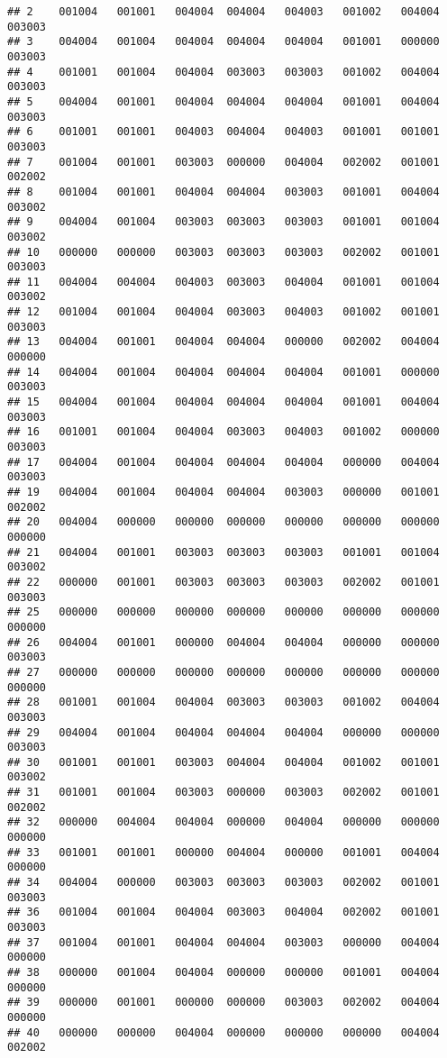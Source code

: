 \documentclass[
]{article}
\begin{document}
\begin{verbatim}
## 2    001004   001001   004004  004004   004003   001002   004004  003003
## 3    004004   001004   004004  004004   004004   001001   000000  003003
## 4    001001   001004   004004  003003   003003   001002   004004  003003
## 5    004004   001001   004004  004004   004004   001001   004004  003003
## 6    001001   001001   004003  004004   004003   001001   001001  003003
## 7    001004   001001   003003  000000   004004   002002   001001  002002
## 8    001004   001001   004004  004004   003003   001001   004004  003002
## 9    004004   001004   003003  003003   003003   001001   001004  003002
## 10   000000   000000   003003  003003   003003   002002   001001  003003
## 11   004004   004004   004003  003003   004004   001001   001004  003002
## 12   001004   001004   004004  003003   004003   001002   001001  003003
## 13   004004   001001   004004  004004   000000   002002   004004  000000
## 14   004004   001004   004004  004004   004004   001001   000000  003003
## 15   004004   001004   004004  004004   004004   001001   004004  003003
## 16   001001   001004   004004  003003   004003   001002   000000  003003
## 17   004004   001004   004004  004004   004004   000000   004004  003003
## 19   004004   001004   004004  004004   003003   000000   001001  002002
## 20   004004   000000   000000  000000   000000   000000   000000  000000
## 21   004004   001001   003003  003003   003003   001001   001004  003002
## 22   000000   001001   003003  003003   003003   002002   001001  003003
## 25   000000   000000   000000  000000   000000   000000   000000  000000
## 26   004004   001001   000000  004004   004004   000000   000000  003003
## 27   000000   000000   000000  000000   000000   000000   000000  000000
## 28   001001   001004   004004  003003   003003   001002   004004  003003
## 29   004004   001004   004004  004004   004004   000000   000000  003003
## 30   001001   001001   003003  004004   004004   001002   001001  003002
## 31   001001   001004   003003  000000   003003   002002   001001  002002
## 32   000000   004004   004004  000000   004004   000000   000000  000000
## 33   001001   001001   000000  004004   000000   001001   004004  000000
## 34   004004   000000   003003  003003   003003   002002   001001  003003
## 36   001004   001004   004004  003003   004004   002002   001001  003003
## 37   001004   001001   004004  004004   003003   000000   004004  000000
## 38   000000   001004   004004  000000   000000   001001   004004  000000
## 39   000000   001001   000000  000000   003003   002002   004004  000000
## 40   000000   000000   004004  000000   000000   000000   004004  002002

\end{verbatim}
\end{document}
